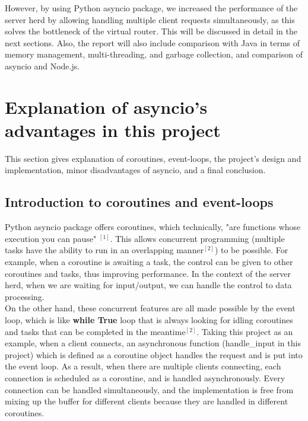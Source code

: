 \documentclass[letterpaper,twocolumn,10pt]{article}
\begin{document}
However, by using Python asyncio package, we increased the performance of the server herd by allowing handling multiple client requests simultaneously, as this solves the bottleneck of the virtual router. This will be discussed in detail in the next sections. Also, the report will also include comparison with Java in terms of memory management, multi-threading, and garbage collection, and comparison of asyncio and Node.js.
\section{Explanation of asyncio's advantages in this project}
This section gives explanation of coroutines, event-loops, the project's design and implementation, minor disadvantages of asyncio, and a final conclusion.
\subsection{Introduction to coroutines and event-loops}
Python asyncio package offers coroutines, which technically, "are functions whose execution you can pause" $^{[1]}$. This allows concurrent programming (multiple tasks have the ability to run in an overlapping manner$^{[2]}$) to be possible. For example, when a coroutine is awaiting a task, the control can be given to other coroutines and tasks, thus improving performance. In the context of the server herd, when we are waiting for input/output, we can handle the control to data processing. \\

On the other hand, these concurrent features are all made possible by the event loop, which is like \textbf{while True} loop that is always looking for idling coroutines and tasks that can be completed in the meantime$^{[2]}$. Taking this project as an example, when a client connects, an asynchronous function (handle\_input in this project) which is defined as a coroutine object handles the request and is put into the event loop. As a result, when there are multiple clients connecting, each connection is scheduled as a coroutine, and is handled asynchronously. Every connection can be handled simultaneously, and the implementation is free from mixing up the buffer for different clients because they are handled in different coroutines.
\end{document}
